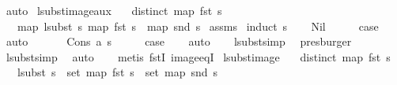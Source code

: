 \begin{isabellebody}
\ auto\isanewline
{}\isamarkupfalse%
%
\endisatagproof
{\isafoldproof}%
%
\isadelimproof
\isanewline
%
\endisadelimproof
\isanewline
\isanewline
{}\isamarkupfalse%
\ lsubst{\isacharunderscore}{\kern0pt}image{\isacharunderscore}{\kern0pt}aux{\isacharcolon}{\kern0pt}\isanewline
\ \ \ {\isachardoublequoteopen}distinct\ {\isacharparenleft}{\kern0pt}map\ fst\ s{\isacharparenright}{\kern0pt}{\isachardoublequoteclose}\isanewline
\ \ \ {\isachardoublequoteopen}map\ {\isacharparenleft}{\kern0pt}lsubst\ s{\isacharparenright}{\kern0pt}\ {\isacharparenleft}{\kern0pt}map\ fst\ s{\isacharparenright}{\kern0pt}\ {\isacharequal}{\kern0pt}\ map\ snd\ s{\isachardoublequoteclose}\isanewline
%
\isadelimproof
%
\endisadelimproof
%
\isatagproof
{}\isamarkupfalse%
\ assms\isanewline
{}\isamarkupfalse%
\ {\isacharparenleft}{\kern0pt}induct\ s{\isacharparenright}{\kern0pt}\isanewline
\ \ \isamarkupfalse%
\ Nil\isanewline
\ \ \isamarkupfalse%
\ \isamarkupfalse%
\ {\isacharquery}{\kern0pt}case\isanewline
\ \ \isamarkupfalse%
\ auto\isanewline
\ \ \isamarkupfalse%
\isanewline
{}\isamarkupfalse%
\isanewline
\ \ \isamarkupfalse%
\ {\isacharparenleft}{\kern0pt}Cons\ a\ s{\isacharparenright}{\kern0pt}\isanewline
\ \ \isamarkupfalse%
\ \isamarkupfalse%
\ {\isacharquery}{\kern0pt}case\isanewline
\ \ \isamarkupfalse%
\ auto\isanewline
\ \ \isamarkupfalse%
\ lsubst{\isacharunderscore}{\kern0pt}simp\ \isamarkupfalse%
\ presburger\isanewline
\ \ \isamarkupfalse%
\ lsubst{\isacharunderscore}{\kern0pt}simp\ \isamarkupfalse%
\ auto\isanewline
\ \ \isamarkupfalse%
\ {\isacharparenleft}{\kern0pt}metis\ fstI\ image{\isacharunderscore}{\kern0pt}eqI{\isacharparenright}{\kern0pt}\isanewline
{}\isamarkupfalse%
%
\endisatagproof
{\isafoldproof}%
%
\isadelimproof
\isanewline
%
\endisadelimproof
\isanewline
\isanewline
{}\isamarkupfalse%
\ lsubst{\isacharunderscore}{\kern0pt}image{\isacharcolon}{\kern0pt}\isanewline
\ \ \ {\isachardoublequoteopen}distinct\ {\isacharparenleft}{\kern0pt}map\ fst\ s{\isacharparenright}{\kern0pt}{\isachardoublequoteclose}\isanewline
\ \ \ {\isachardoublequoteopen}lsubst\ s\ {\isacharbackquote}{\kern0pt}\ set\ {\isacharparenleft}{\kern0pt}map\ fst\ s{\isacharparenright}{\kern0pt}\ {\isacharequal}{\kern0pt}\ set\ {\isacharparenleft}{\kern0pt}map\ snd\ s{\isacharparenright}{\kern0pt}{\isachardoublequoteclose}\isanewline

\end{isabellebody}
